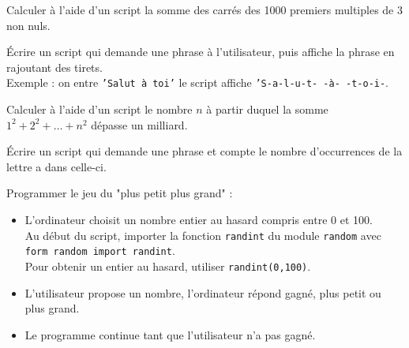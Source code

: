 \begin{exercice}
    Calculer à l'aide d'un script la somme des carrés des 1000 premiers multiples de 3 non nuls.
\end{exercice}

\begin{exercice}
    \'Ecrire un script qui demande une phrase à l'utilisateur, puis affiche la phrase en rajoutant des tirets.\\
    Exemple : on entre \texttt{'Salut à toi'} le script affiche \texttt{'S-a-l-u-t- -à- -t-o-i-}.
\end{exercice}

\begin{exercice}
    Calculer à l'aide d'un script le nombre $n$ à partir duquel la somme $1^2+2^2+\ldots+n^2$ dépasse un milliard.
\end{exercice}

\begin{exercice}
    \'Ecrire un script qui demande une phrase et compte le nombre d'occurrences de la lettre \og a \fg{} dans celle-ci.
\end{exercice}

\begin{exercice}
    Programmer le jeu du "plus petit plus grand" :
    \begin{itemize}
        \item   L'ordinateur choisit un nombre entier au hasard compris entre 0 et 100.\\
        Au début du script, importer la fonction \texttt{randint} du module \texttt{random} avec \texttt{form random import randint}.\\
        Pour obtenir un entier au hasard, utiliser \texttt{randint(0,100)}.
        \item   L'utilisateur propose un nombre, l'ordinateur répond \og gagné\fg, \og plus petit\fg{} ou \og plus grand\fg.
        \item   Le programme continue tant que l'utilisateur n'a pas gagné.
    \end{itemize}
\end{exercice}

